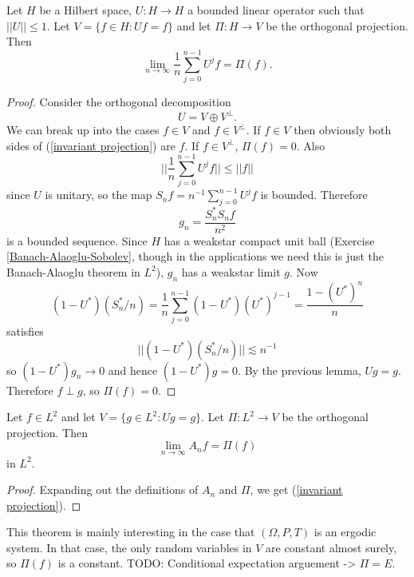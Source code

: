 \begin{lemma}
Let $H$ be a Hilbert space, $U: H \to H$ a bounded linear operator such that $||U|| \leq 1$.
Let $V = \{f \in H: Uf = f\}$ and let $\Pi: H \to V$ be the orthogonal projection. Then
\begin{equation}
\label{invariant projection}
\lim_{n \to \infty} \frac{1}{n} \sum_{j=0}^{n-1} U^jf = \Pi(f).
\end{equation}
\end{lemma}
\begin{proof}
Consider the orthogonal decomposition
\[U = V \oplus V^\perp.\]
We can break up into the cases $f \in V$ and $f \in V^\perp$.
If $f \in V$ then obviously both sides of (\ref{invariant projection}) are $f$.
If $f \in V^\perp$, $\Pi(f) = 0$.
Also
\[||\frac{1}{n} \sum_{j=0}^{n-1} U^jf|| \leq ||f||\]
since $U$ is unitary, so the map $S_{n}f = n^{-1} \sum_{j=0}^{n-1} U^jf$ is bounded.
Therefore
\[g_{n} = \frac{S_{n}^*S_{n}f}{n^2}\]
is a bounded sequence. Since $H$ has a weakstar compact unit ball (Exercise \ref{Banach-Alaoglu-Sobolev}, though in the applications we need this is just the Banach-Alaoglu theorem in $L^2$), $g_{n}$ has a weakstar limit $g$.
Now
\[(1 - U^*)(S_{n}^*/n) = \frac{1}{n} \sum_{j=0}^{n-1} (1 - U^*)(U^*)^{j-1} = \frac{1 - (U^*)^n}{n}\]
satisfies
\[||(1 - U^*)(S_{n}^*/n)|| \lesssim n^{-1}\]
so $(1 - U^*)g_{n} \to 0$ and hence $(1 - U^*)g = 0$.
By the previous lemma, $Ug = g$. Therefore $f \perp g$, so $\Pi(f) = 0$.
\end{proof}

\begin{theorem}
Let $f \in L^2$ and let $V = \{g \in L^2: Ug = g\}$.
Let $\Pi: L^2 \to V$ be the orthogonal projection.
Then
\[\lim_{n \to \infty} A_{n}f = \Pi(f)\]
in $L^2$.
\end{theorem}
\begin{proof}
Expanding out the definitions of $A_{n}$ and $\Pi$, we get (\ref{invariant projection}).
\end{proof}

This theorem is mainly interesting in the case that $(\Omega, P, T)$ is an ergodic system.
In that case, the only random variables in $V$ are constant almost surely, so $\Pi(f)$ is a constant.
TODO: Conditional expectation arguement -> $\Pi = E$.
